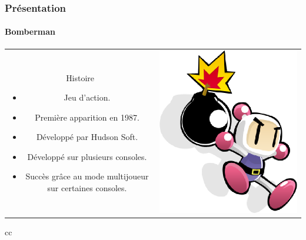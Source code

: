 \begin{frame}
\frametitle{Présentation}
\framesubtitle{Bomberman}
\begin{tabular}{cc}

\begin{minipage}{7cm}
Histoire
	\begin{itemize}
		\item Jeu d'action.
		\item Première apparition en 1987.
		\item Développé par Hudson Soft.
		\item Développé sur plusieurs consoles.
		\item Succès grâce au mode multijoueur sur certaines consoles.
	\end{itemize}
\end{minipage} 
&
\begin{minipage}{8cm}
\includegraphics[scale=0.3]{img/bomberman1.png} 
\end{minipage} 

\end{tabular}{cc}

\end{frame}


 


